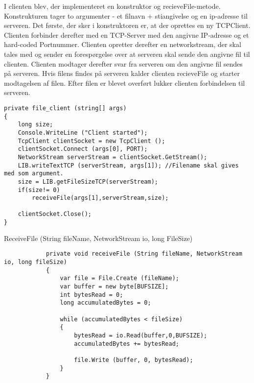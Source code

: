 I clienten blev, der implementeret en konstruktor og recieveFile-metode.
Konstrukturen tager to argumenter - et filnavn + stiangivelse og en ip-adresse til serveren.
Det første, der sker i konstruktoren er, at der oprettes en ny TCPClient. Clienten forbinder derefter med en TCP-Server med den angivne IP-adresse og et hard-coded Portnummer.
Clienten opretter derefter en networkstream, der skal tales med og sender en forespørgelse over at serveren skal sende den angivne fil til clienten. Clienten modtager derefter svar fra serveren om den angivne fil sendes på serveren. Hvis filens findes på serveren kalder clienten recieveFile og starter modtagelsen af filen.
Efter filen er blevet overført lukker clienten forbindelsen til serveren.
\begin{verbatim}
private file_client (string[] args)
{
	long size;
	Console.WriteLine ("Client started");
	TcpClient clientSocket = new TcpClient ();
	clientSocket.Connect (args[0], PORT);
	NetworkStream serverStream = clientSocket.GetStream();
	LIB.writeTextTCP (serverStream, args[1]); //Filename skal gives med som argument.
	size = LIB.getFileSizeTCP(serverStream);
	if(size!= 0)
		receiveFile(args[1],serverStream,size);

	clientSocket.Close();
}
\end{verbatim}

\noindent ReceiveFile (String fileName, NetworkStream io, long FileSize) 

\begin{verbatim}
			private void receiveFile (String fileName, NetworkStream io, long fileSize)
			{
				var file = File.Create (fileName);
				var buffer = new byte[BUFSIZE];
				int bytesRead = 0;
				long accumulatedBytes = 0;
			
				while (accumulatedBytes < fileSize) 
				{
					bytesRead = io.Read(buffer,0,BUFSIZE);
					accumulatedBytes += bytesRead;
			
					file.Write (buffer, 0, bytesRead);
				}
			}
\end{verbatim}